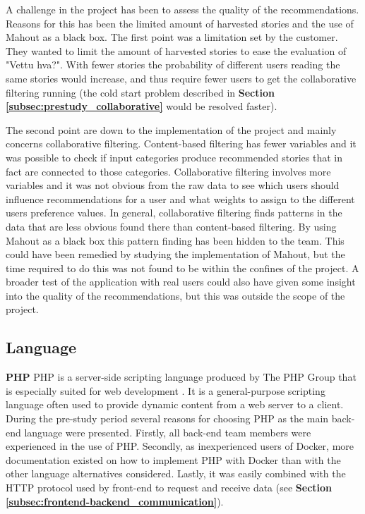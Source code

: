 A challenge in the project has been to assess the quality of the recommendations. Reasons for this has been the limited amount of harvested stories and the use of Mahout as a black box. The first point was a limitation set by the customer. They wanted to limit the amount of harvested stories to ease the evaluation of "Vettu hva?". With fewer stories the probability of different users reading the same stories would increase, and thus require fewer users to get the collaborative filtering running (the cold start problem described in \textbf{Section \ref{subsec:prestudy_collaborative}} would be resolved faster). \newline

The second point are down to the implementation of the project and mainly concerns collaborative filtering. Content-based filtering has fewer variables and it was possible to check if input categories produce recommended stories that in fact are connected to those categories. Collaborative filtering involves more variables and it was not obvious from the raw data to see which users should influence recommendations for a user and what weights to assign to the different users preference values. In general, collaborative filtering finds patterns in the data that are less obvious found there than content-based filtering. By using Mahout as a black box this pattern finding has been hidden to the team. This could have been remedied by studying the implementation of Mahout, but the time required to do this was not found to be within the confines of the project. A broader test of the application with real users could also have given some insight into the quality of the recommendations, but this was outside the scope of the project. \newline


\subsection{Language}
\label{subsec:backend_language}
\textbf{PHP}\newline
PHP is a server-side scripting language produced by The PHP Group that is especially suited for web development  \cite{HM8}. It is a general-purpose scripting language often used to provide dynamic content from a web server to a client. During the pre-study period several reasons for choosing PHP as the main back-end language were presented. Firstly, all back-end team members were experienced in the use of PHP. Secondly, as inexperienced users of Docker, more documentation existed on how to implement PHP with Docker than with the other language alternatives considered. Lastly, it was easily combined with the HTTP protocol used by front-end to request and receive data (see \textbf{Section \ref{subsec:frontend-backend_communication}}).\newline

